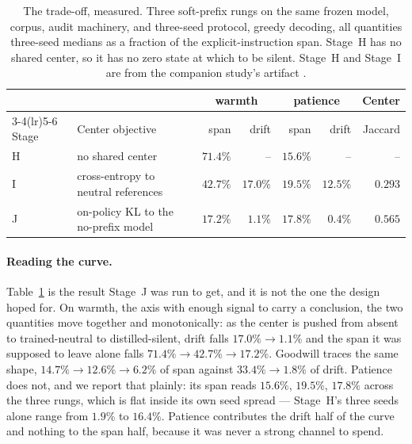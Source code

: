 \documentclass[10pt]{article}
\begin{document}
\begin{table}[t]
\centering
\caption{The trade-off, measured. Three soft-prefix rungs on the same frozen
model, corpus, audit machinery, and three-seed protocol, greedy decoding, all
quantities three-seed medians as a fraction of the explicit-instruction span.
Stage~H has no shared center, so it has no zero state at which to be silent.
Stage~H and Stage~I are from the companion study's artifact
\cite{penov2026prefix}.}
\label{tab:tradeoff}
\begin{tabular}{llrrrrr}
\toprule
& & \multicolumn{2}{c}{warmth} & \multicolumn{2}{c}{patience} & Center \\
\cmidrule(lr){3-4}\cmidrule(lr){5-6}
Stage & Center objective & span & drift & span & drift & Jaccard \\
\midrule
H & no shared center                      & $71.4\%$ & --        & $15.6\%$ & --        & -- \\
I & cross-entropy to neutral references    & $42.7\%$ & $17.0\%$  & $19.5\%$ & $12.5\%$  & $0.293$ \\
J & on-policy KL to the no-prefix model    & $17.2\%$ & $\mathbf{1.1\%}$ & $17.8\%$ & $\mathbf{0.4\%}$ & $0.565$ \\
\bottomrule
\end{tabular}
\end{table}

\paragraph{Reading the curve.} Table~\ref{tab:tradeoff} is the result Stage~J
was run to get, and it is not the one the design hoped for. On warmth, the axis
with enough signal to carry a conclusion, the two quantities move together and
monotonically: as the center is pushed from absent to trained-neutral to
distilled-silent, drift falls $17.0\% \rightarrow 1.1\%$ and the span it was
supposed to leave alone falls $71.4\% \rightarrow 42.7\% \rightarrow 17.2\%$.
Goodwill traces the same shape, $14.7\% \rightarrow 12.6\% \rightarrow 6.2\%$ of
span against $33.4\% \rightarrow 1.8\%$ of drift. Patience does not, and we
report that plainly: its span reads $15.6\%$, $19.5\%$, $17.8\%$ across the
three rungs, which is flat inside its own seed spread --- Stage~H's three seeds
alone range from $1.9\%$ to $16.4\%$. Patience contributes the drift half of the
curve and nothing to the span half, because it was never a strong channel to
spend.
\end{document}

